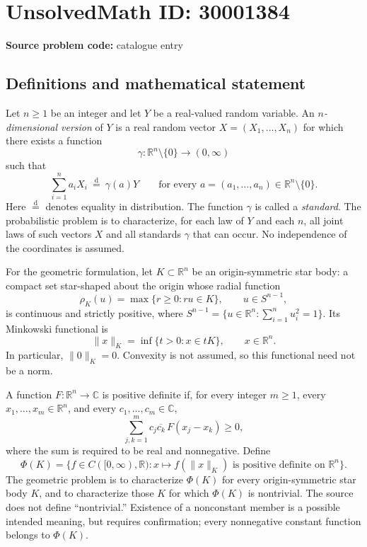 \documentclass[11pt]{article}
\newcommand{\R}{\mathbb{R}}
\newcommand{\C}{\mathbb{C}}
\begin{document}
\section*{UnsolvedMath ID: 30001384}
\textbf{Source problem code:} catalogue entry
\subsection{Definitions and mathematical statement}
Let \(n\geq 1\) be an integer and let \(Y\) be a real-valued random variable. An \emph{\(n\)-dimensional version} of \(Y\) is a real random vector \(X=(X_1,\ldots,X_n)\) for which there exists a function
\[
\gamma:\R^n\setminus\{0\}\longrightarrow(0,\infty)
\]
such that
\[
\sum_{i=1}^n a_iX_i\ \stackrel{\mathrm d}{=}\ \gamma(a)Y
\qquad\text{for every }a=(a_1,\ldots,a_n)\in\R^n\setminus\{0\}.
\]
Here \(\stackrel{\mathrm d}{=}\) denotes equality in distribution. The function \(\gamma\) is called a \emph{standard}. The probabilistic problem is to characterize, for each law of \(Y\) and each \(n\), all joint laws of such vectors \(X\) and all standards \(\gamma\) that can occur. No independence of the coordinates is assumed.

For the geometric formulation, let \(K\subset\R^n\) be an origin-symmetric star body: a compact set star-shaped about the origin whose radial function
\[
\rho_K(u)=\max\{r\geq0:ru\in K\},\qquad u\in S^{n-1},
\]
is continuous and strictly positive, where \(S^{n-1}=\{u\in\R^n:\sum_{i=1}^n u_i^2=1\}\). Its Minkowski functional is
\[
\|x\|_K=\inf\{t>0:x\in tK\},\qquad x\in\R^n.
\]
In particular, \(\|0\|_K=0\). Convexity is not assumed, so this functional need not be a norm.

A function \(F:\R^n\to\C\) is positive definite if, for every integer \(m\geq1\), every \(x_1,\ldots,x_m\in\R^n\), and every \(c_1,\ldots,c_m\in\C\),
\[
\sum_{j,k=1}^m c_j\overline{c_k}\,F(x_j-x_k)\geq0,
\]
where the sum is required to be real and nonnegative. Define
\[
\Phi(K)=\bigl\{f\in C([0,\infty),\R):x\longmapsto f(\|x\|_K)\text{ is positive definite on }\R^n\bigr\}.
\]
The geometric problem is to characterize \(\Phi(K)\) for every origin-symmetric star body \(K\), and to characterize those \(K\) for which \(\Phi(K)\) is nontrivial. The source does not define ``nontrivial.'' Existence of a nonconstant member is a possible intended meaning, but requires confirmation; every nonnegative constant function belongs to \(\Phi(K)\).
\end{document}
